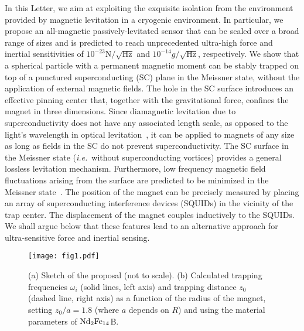 \documentclass[twocolumn,superscriptaddress,floatfix,preprintnumbers,prl]{revtex4}
\begin{document}
In this Letter, we aim at exploiting the exquisite isolation from the environment provided by magnetic levitation in a cryogenic environment. In particular, we propose an all-magnetic passively-levitated sensor that can be scaled over a broad range of sizes and is predicted to  reach unprecedented ultra-high force and inertial sensitivities of $10^{-23}\text{N}/\sqrt{\text{Hz}}$ and $10^{-14}g/\sqrt{\text{Hz}}$, respectively. We show that a spherical particle with a permanent magnetic moment can be stably trapped on top of a punctured superconducting (SC) plane in the Meissner state, without the application of external magnetic fields.
The hole in the SC surface introduces an effective pinning center that, together with the gravitational force, confines the magnet in three dimensions.
%
Since diamagnetic levitation due to superconductivity does not have any associated length scale, as opposed to the light's wavelength in optical levitation~\cite{Pflanzer2012,Jain2016}, it can be applied to magnets of any size as long as fields in the SC do not prevent superconductivity. The SC surface in the Meissner state ({\em i.e.}~without superconducting vortices) provides a general lossless levitation mechanism. Furthermore, low frequency magnetic field fluctuations arising from the surface are predicted to be minimized in the Meissner state~\cite{Skagerstam06,Hohenester07}. 
The position of the magnet can be precisely measured by placing an array of superconducting interference devices (SQUIDs) in the vicinity of the trap center. The displacement of the magnet couples inductively to the SQUIDs. We shall argue below that these features lead to an alternative approach for ultra-sensitive force and inertial sensing.

\begin{figure}[t]
\begin{center}
\texttt{[image: fig1.pdf]}
\caption{ (a) Sketch of the proposal (not to scale). 
(b) Calculated trapping frequencies $\omega_i$ (solid lines, left axis) and trapping distance $z_0$ (dashed line, right axis) as a function of the radius of the magnet, setting $z_0/a=1.8$ (where $a$ depends on $R$) and using the material parameters of ${\rm Nd}_2{\rm Fe}_{14}$B.}
\label{fig.1}
\end{center}
\end{figure}
\end{document}
